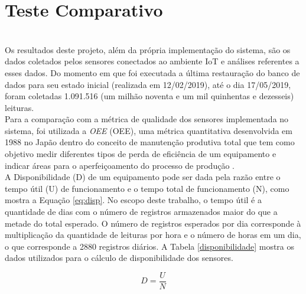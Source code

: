  \section{Teste Comparativo}
 \label{sec:testecomparativo}
\\\null \quad Os resultados deste projeto, além da própria implementação do sistema, são os dados coletados pelos sensores conectados ao ambiente \acrshort{IoT} e análises referentes a esses dados.
 Do momento em que foi executada a última restauração do banco de dados para seu estado inicial (realizada em 12/02/2019), até o dia 17/05/2019, foram coletadas 1.091.516 (um milhão noventa e um mil quinhentas e dezesseis) leituras.
\\\null \quad Para a comparação com a métrica de qualidade dos sensores implementada no sistema, foi utilizada a \textit{\acrlong{OEE}} (\acrshort{OEE}), uma métrica quantitativa desenvolvida em 1988 no Japão dentro do conceito de manutenção produtiva total que tem como objetivo medir diferentes tipos de perda de eficiência de um equipamento e indicar áreas para o aperfeiçoamento do processo de produção \cite{artigoOEE}.
\\\null \quad A Disponibilidade (D) de um equipamento pode ser dada pela razão entre o tempo útil (U) de funcionamento e o tempo total de funcionamento (N), como mostra a Equação \ref{eq:disp}. No escopo deste trabalho, o tempo útil é a quantidade de dias com o número de registros armazenados maior do que a metade do total esperado. O número de registros esperados por dia corresponde à multiplicação da quantidade de leituras por hora e o número de horas em um dia, o que corresponde a 2880 registros diários. A Tabela \ref{disponibilidade} mostra os dados utilizados para o cálculo de disponibilidade dos sensores.

\begin{equation}
  D = \frac{U}{N}
  \label{eq:disp}
\end{equation}

